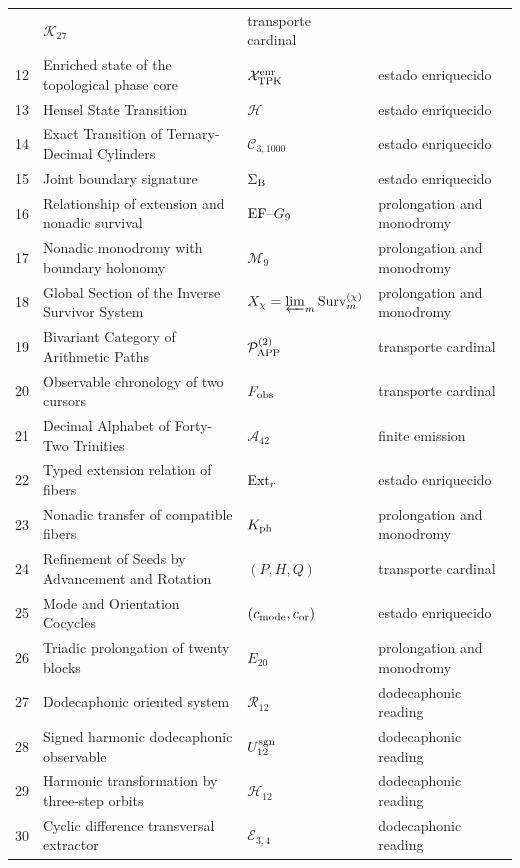 \begin{longtable}{@{}r >{\raggedright\arraybackslash}p{}
  >{\raggedright\arraybackslash}p{}
  >{\raggedright\arraybackslash}p{}@{}}
  & \(\mathcal K_{27}\) & transporte cardinal \\
12 & Enriched state of the topological phase core
  & \(\mathcal X_{\rm TPK}^{\rm enr}\) & estado enriquecido \\
13 & Hensel State Transition
  & \(\mathcal H\) & estado enriquecido \\
14 & Exact Transition of Ternary-Decimal Cylinders
  & \(\mathcal C_{3,1000}\) & estado enriquecido \\
15 & Joint boundary signature
  & \(\Sigma_{\rm B}\) & estado enriquecido \\
16 & Relationship of extension and nonadic survival
  & \({\rm EF}\text{--}G_9\) & prolongation and monodromy \\
17 & Nonadic monodromy with boundary holonomy
  & \(\mathcal M_9\) & prolongation and monodromy \\
18 & Global Section of the Inverse Survivor System
  & \(X_\chi=\varprojlim_m{\rm Surv}^{(\chi)}_m\)
  & prolongation and monodromy \\
19 & Bivariant Category of Arithmetic Paths
  & \(\mathcal P_{\rm APP}^{(2)}\) & transporte cardinal \\
20 & Observable chronology of two cursors
  & \(F_{\rm obs}\) & transporte cardinal \\
21 & Decimal Alphabet of Forty-Two Trinities
  & \(\mathcal A_{42}\) & finite emission \\
22 & Typed extension relation of fibers
  & \({\rm Ext}_r\) & estado enriquecido \\
23 & Nonadic transfer of compatible fibers
  & \(K_{\rm ph}\) & prolongation and monodromy \\
24 & Refinement of Seeds by Advancement and Rotation
  & \((P,H,Q)\) & transporte cardinal \\
25 & Mode and Orientation Cocycles
  & \((c_{\rm mode},c_{\rm or})\) & estado enriquecido \\
26 & Triadic prolongation of twenty blocks
  & \(E_{20}\) & prolongation and monodromy \\
27 & Dodecaphonic oriented system
  & \(\mathcal R_{12}\) & dodecaphonic reading \\
28 & Signed harmonic dodecaphonic observable
  & \(U_{12}^{\rm sgn}\) & dodecaphonic reading \\
29 & Harmonic transformation by three-step orbits
  & \(\mathcal H_{12}\) & dodecaphonic reading \\
30 & Cyclic difference transversal extractor
  & \(\mathcal E_{3,4}\) & dodecaphonic reading \\

\end{longtable}
